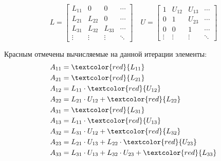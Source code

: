 \[L = \begin{bmatrix}
        L_{11} & 0      & 0      & \cdots \\
        L_{21} & L_{22} & 0      & \cdots \\
        L_{31} & L_{32} & L_{33} & \cdots \\
        \vdots & \vdots & \vdots & \ddots
    \end{bmatrix}
    \quad U = \begin{bmatrix}
        1      & U_{12} & U_{13} & \cdots \\
        0      & 1      & U_{23} & \cdots \\
        0      & 0      & 1      & \cdots \\
        \vdots & \vdots & \vdots & \ddots
    \end{bmatrix}  \]
\begin{example}
    Красным отмечены вычисляемые на данной итерации элементы:
    \begin{align*}
        A_{11} & = \textcolor{red}{L_{11}}                                             \\
        A_{21} & = \textcolor{red}{L_{21}}                                             \\
        A_{12} & = L_{11} \cdot \textcolor{red}{U_{12}}                                \\
        A_{22} & = L_{21} \cdot U_{12} + \textcolor{red}{L_{22}}                       \\
        A_{31} & = \textcolor{red}{L_{31}}                                             \\
        A_{13} & = L_{11} \cdot \textcolor{red}{U_{13}}                                \\
        A_{32} & = L_{31} \cdot U_{12} + \textcolor{red}{L_{32}}                       \\
        A_{23} & = L_{21} \cdot U_{13} + L_{22} \cdot \textcolor{red}{U_{23}}          \\
        A_{33} & = L_{31} \cdot U_{13} + L_{32} \cdot U_{23} + \textcolor{red}{L_{33}} \\
    \end{align*}
\end{example}

